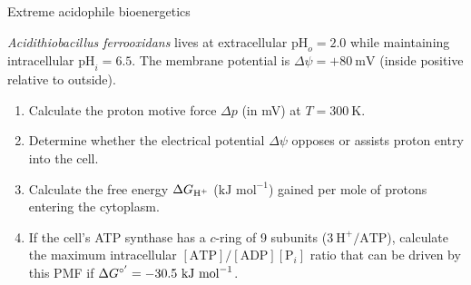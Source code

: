 \documentclass[12pt, a4paper, oneside]{report}
\begin{document}
\begin{problem}{\enspace{}
  \enspace{}\enspace{}\enspace
  Extreme acidophile bioenergetics}

  \textit{Acidithiobacillus ferrooxidans} lives at extracellular $\text{pH}_o = 2.0$ while maintaining intracellular $\text{pH}_i = 6.5$. The membrane potential is $\Delta\psi = +80~\text{mV}$ (inside positive relative to outside).

  \begin{enumerate}
    \item Calculate the proton motive force $\Delta p$ (in mV) at $T = 300~\text{K}$.
    \item Determine whether the electrical potential $\Delta\psi$ opposes or assists proton entry into the cell.
    \item Calculate the free energy $\Delta G_{\text{H}^+}$ ($\text{kJ~mol}^{-1}$) gained per mole of protons entering the cytoplasm.
    \item If the cell's ATP synthase has a $c$-ring of 9 subunits ($3~\text{H}^+/\text{ATP}$), calculate the maximum intracellular $[\text{ATP}]/[\text{ADP}][\text{P}_i]$ ratio that can be driven by this PMF if $\Delta G^{\circ'} = -30.5~\text{kJ~mol}^{-1}$.
  \end{enumerate}
\end{problem}
\end{document}
